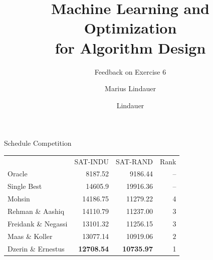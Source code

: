 \documentclass[t]{beamer}
\title[MLOAD]{Machine Learning and Optimization\\ for Algorithm Design}
\subtitle{Feedback on Exercise 6}
\author{Marius Lindauer}
\institute{University of Freiburg}
\date{}
\begin{document}
{
}
\author{Lindauer}
\institute{}
\logo{}

\begin{frame}[c,fragile]{Schedule Competition}

\centering
\begin{tabular}{l rr r}
\toprule
 & SAT-INDU & SAT-RAND & Rank\\
Oracle & 8187.52 & 9186.44 & --\\
Single Best & 14605.9 &	19916.36 & --\\

\midrule
\pause
Mohsin & 14186.75 & 11279.22 & 4\\
\pause
Rehman \& Aashiq & 14110.79 & 11237.00 & 3\\
Freidank \& Negassi & 13101.32 & 11256.15 & 3\\
\pause
Maas \& Koller & 13077.14 & 10919.06 & $2$\\
\pause
Dzerin \& Ernestus & \textbf{12708.54} & \textbf{10735.97} & 1\\
\bottomrule
\end{tabular}

\end{frame}
\end{document}
